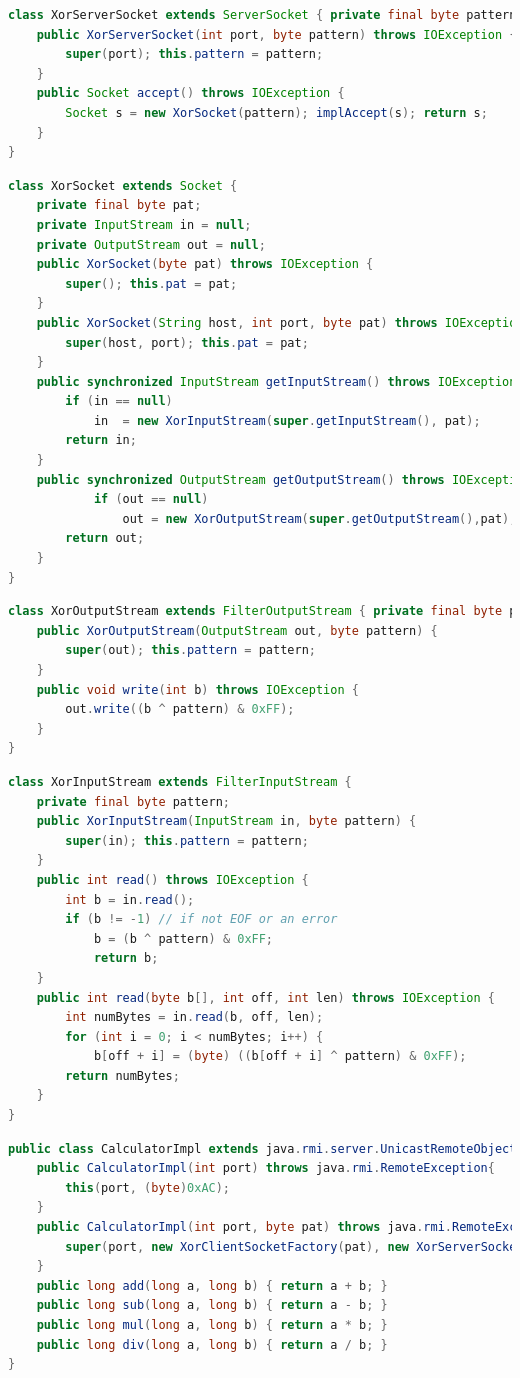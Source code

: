 \documentclass[10pt]{article}
\begin{document}
\begin{lstlisting}[language=Java, caption=XorServerSocket, style=JavaStyle]
class XorServerSocket extends ServerSocket { private final byte pattern;
	public XorServerSocket(int port, byte pattern) throws IOException {
		super(port); this.pattern = pattern;
	}
	public Socket accept() throws IOException {
		Socket s = new XorSocket(pattern); implAccept(s); return s;
	}
}
\end{lstlisting}
\begin{lstlisting}[language=Java, caption=XorSocket, style=JavaStyle]
class XorSocket extends Socket { 
	private final byte pat;
	private InputStream in = null;
	private OutputStream out = null;
	public XorSocket(byte pat) throws IOException {
		super(); this.pat = pat;
	}
	public XorSocket(String host, int port, byte pat) throws IOException {
		super(host, port); this.pat = pat;
	}
	public synchronized InputStream getInputStream() throws IOException {
		if (in == null) 
			in  = new XorInputStream(super.getInputStream(), pat);
		return in;
	}
	public synchronized OutputStream getOutputStream() throws IOException {
    		if (out == null)
    			out = new XorOutputStream(super.getOutputStream(),pat);
		return out;
	}
}
\end{lstlisting}
\begin{lstlisting}[language=Java, caption=XorOutputStream, style=JavaStyle]
class XorOutputStream extends FilterOutputStream { private final byte pattern;
	public XorOutputStream(OutputStream out, byte pattern) {
		super(out); this.pattern = pattern;
	}
	public void write(int b) throws IOException { 
		out.write((b ^ pattern) & 0xFF);
	}
}
\end{lstlisting}
\begin{lstlisting}[language=Java, caption=XorOutputStream, style=JavaStyle]
class XorInputStream extends FilterInputStream {
	private final byte pattern;
	public XorInputStream(InputStream in, byte pattern) {
		super(in); this.pattern = pattern;
	}
	public int read() throws IOException {
		int b = in.read();
		if (b != -1) // if not EOF or an error
      		b = (b ^ pattern) & 0xFF;
    		return b;
	}
	public int read(byte b[], int off, int len) throws IOException {
		int numBytes = in.read(b, off, len);
		for (int i = 0; i < numBytes; i++) {
			b[off + i] = (byte) ((b[off + i] ^ pattern) & 0xFF);
		return numBytes;
	}
}
\end{lstlisting}
\begin{lstlisting}[language=Java, caption=Use XorFactories, style=JavaStyle]
public class CalculatorImpl extends java.rmi.server.UnicastRemoteObject implements rmi.calculator.Calculator {
	public CalculatorImpl(int port) throws java.rmi.RemoteException{
		this(port, (byte)0xAC);
  	}
	public CalculatorImpl(int port, byte pat) throws java.rmi.RemoteException {
		super(port, new XorClientSocketFactory(pat), new XorServerSocketFactory(pat));
	}
	public long add(long a, long b) { return a + b; } 
	public long sub(long a, long b) { return a - b; } 
	public long mul(long a, long b) { return a * b; } 
	public long div(long a, long b) { return a / b; }
}
\end{lstlisting}
\end{document}
